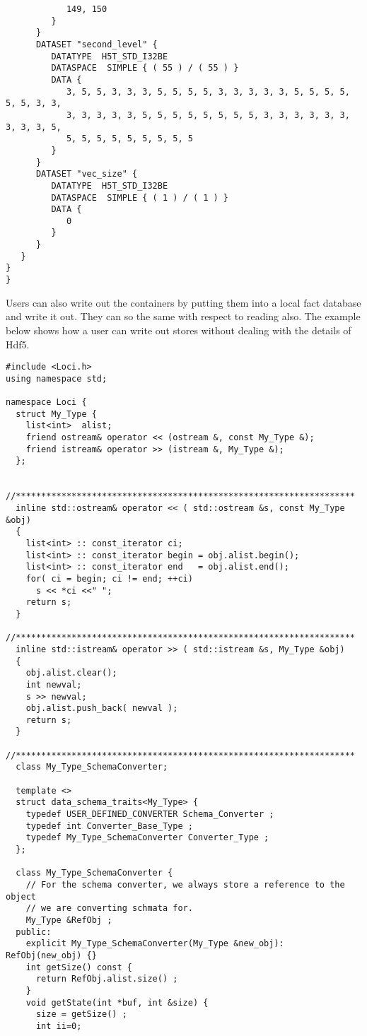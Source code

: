 {\begin{verbatim}
            149, 150
         } 
      } 
      DATASET "second_level" {
         DATATYPE  H5T_STD_I32BE  
         DATASPACE  SIMPLE { ( 55 ) / ( 55 ) } 
         DATA {
            3, 5, 5, 3, 3, 3, 5, 5, 5, 5, 3, 3, 3, 3, 3, 5, 5, 5, 5, 5, 5, 3, 3,
            3, 3, 3, 3, 3, 5, 5, 5, 5, 5, 5, 5, 5, 3, 3, 3, 3, 3, 3, 3, 3, 3, 5,
            5, 5, 5, 5, 5, 5, 5, 5, 5
         } 
      } 
      DATASET "vec_size" {
         DATATYPE  H5T_STD_I32BE  
         DATASPACE  SIMPLE { ( 1 ) / ( 1 ) } 
         DATA {
            0
         } 
      } 
   } 
} 
} 
\end{verbatim} 
%
Users can also write out the containers by putting them into a local
fact database and write it out. They can so the same with respect to
reading also. The example below shows how a user can write out stores
without dealing with the details of Hdf5. 
%
\begin{verbatim}
#include <Loci.h>
using namespace std;

namespace Loci {
  struct My_Type {
    list<int>  alist;
    friend ostream& operator << (ostream &, const My_Type &);
    friend istream& operator >> (istream &, My_Type &);
  };
  
  //*******************************************************************
  inline std::ostream& operator << ( std::ostream &s, const My_Type &obj)
  {
    list<int> :: const_iterator ci;
    list<int> :: const_iterator begin = obj.alist.begin();
    list<int> :: const_iterator end   = obj.alist.end();
    for( ci = begin; ci != end; ++ci)
      s << *ci <<" ";
    return s;
  }
  //*******************************************************************
  inline std::istream& operator >> ( std::istream &s, My_Type &obj)
  {
    obj.alist.clear();
    int newval;
    s >> newval;
    obj.alist.push_back( newval );
    return s;
  }
  //*******************************************************************
  class My_Type_SchemaConverter;
  
  template <>
  struct data_schema_traits<My_Type> {
    typedef USER_DEFINED_CONVERTER Schema_Converter ;
    typedef int Converter_Base_Type ;
    typedef My_Type_SchemaConverter Converter_Type ;
  };
  
  class My_Type_SchemaConverter {
    // For the schema converter, we always store a reference to the object
    // we are converting schmata for.
    My_Type &RefObj ;
  public:
    explicit My_Type_SchemaConverter(My_Type &new_obj): RefObj(new_obj) {}
    int getSize() const {
      return RefObj.alist.size() ;
    }
    void getState(int *buf, int &size) {
      size = getSize() ;
      int ii=0;
      

\end{verbatim}}
